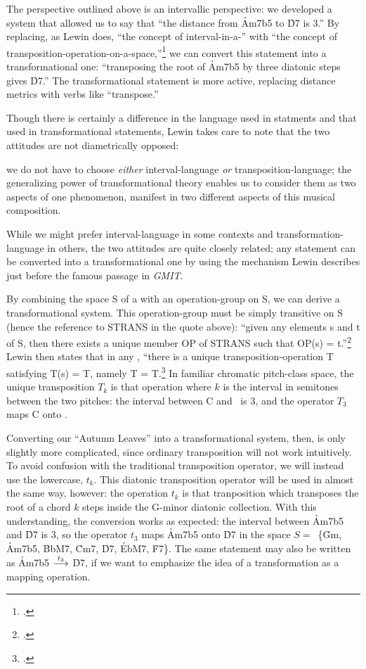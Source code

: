 \documentclass[diss]{subfiles}
\begin{document}
The \gis{} perspective outlined above is an intervallic perspective: we developed
a system that allowed us to say that “the distance from \h{Am7b5} to \h{D7} is
3.” By replacing, as Lewin does, “the concept of interval-in-a-\gis{}” with “the
concept of transposition-operation-on-a-space,”\footcite[157]{lewin:gmit} we
can convert this \gis{} statement into a transformational one: “transposing the
root of \h{Am7b5} by three diatonic steps gives \h{D7}.” The transformational
statement is more active, replacing distance metrics with verbs like
“transpose.”

Though there is certainly a difference in the language used in \gis{} statments
and that used in transformational statements, Lewin takes care to note that
the two attitudes are not diametrically opposed:
\begin{quoting}
  \singlespacing
  we do not have to choose \emph{either} interval-language \emph{or}
  transposition-language; the generalizing power of transformational theory
  enables us to consider them as two aspects of one phenomenon, manifest in
  two different aspects of this musical composition.
\end{quoting}
While we might prefer interval-language in some contexts and
transformation-language in others, the two attitudes are quite closely
related; any \gis{} statement can be converted into a transformational one by
using the mechanism Lewin describes just before the famous passage in
\emph{GMIT}.

By combining the space S of a \gis{} with an operation-group on S, we can derive
a transformational system. This operation-group must be simply transitive on S
(hence the reference to STRANS in the quote above): “given any elements s and
t of S, then there exists a unique member OP of STRANS such that OP(s) =
t.”\footcite[157]{lewin:gmit} Lewin then states that in any \gis{}, “there is a
unique transposition-operation T satisfying T(s) = T, namely T =
T.\footcite[157]{lewin:gmit} In familiar chromatic pitch-class
space, the unique transposition $T_k$ is that operation where $k$ is the
interval in semitones between the two pitches: the interval between C and
\Eflat\ is 3, and the operator $T_3$ maps C onto \Eflat.

Converting our “Autumn Leaves” \gis{} into a transformational system, then, is
only slightly more complicated, since ordinary transposition will not work
intuitively. To avoid confusion with the traditional transposition operator,
we will instead use the lowercase, $t_k$. This diatonic transposition
operator will be used in almost the same way, however: the operation $t_k$ is
that tranposition which transposes the root of a chord $k$ steps inside the
G-minor diatonic collection. With this understanding, the conversion works as
expected: the interval between \h{Am7b5} and \h{D7} is 3, so the operator
$t_3$ maps \h{Am7b5} onto \h{D7} in the space \mbox{$S =$ \{\h{Gm},}
\h{Am7b5}, \h{BbM7}, \h{Cm7}, \h{D7}, \h{EbM7}, \h{F7}\}. The same
statement may also be written as \h{Am7b5} $\overset{t_3}{\longrightarrow}$ \h{D7}, if we
want to emphasize the idea of a transformation as a mapping operation.
\end{document}
